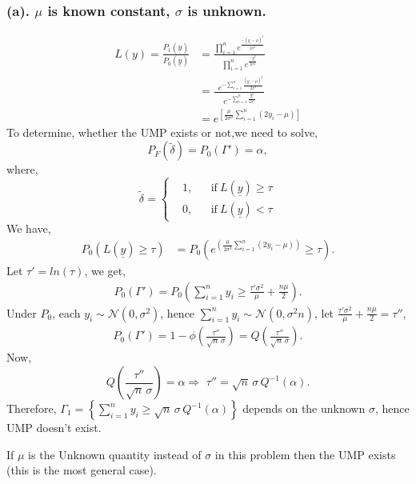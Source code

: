 \documentclass[a4paper,english,12pt]{article}
\begin{document}
\subsubsection*{(a). $\mu$ is known constant, $\sigma$ is unknown.}
\begin{align*}
L(y)=\frac{P_1(\underline{y})}{P_0(\underline{y})}&=\frac{\prod\limits_{i=1}^{n} e^{\frac{-(y_i - \mu)^2}{2 \sigma^2}}}{ \prod\limits_{i=1}^{n} e^{\frac{-y_i^2}{2 \sigma^2}}}\\
&=\frac{\,\,\, e^{-\sum\limits_{i=1}^n \frac{(y_i - \mu)^2}{2 \sigma^2}}}{\, e^{-\sum\limits_{i=1}^n\frac{y_i^2}{2 \sigma^2}}}\\
&=e^{\left[\frac{\mu}{2 \sigma^2}\sum\limits_{i=1}^n(2y_i-\mu)\right]}
\end{align*}
To determine, whether the UMP exists or not,we need to solve,
\begin{equation}
P_F(\tilde{\delta})=P_0(\Gamma')=\alpha,
\end{equation}
where,
 \begin{equation}
\tilde{\delta}= \left \{
  \begin{aligned}
    &1, && \text{if}\ L(\underline{y})\geq\tau \\
    &0, && \text{if}\ L(\underline{y})<\tau 
  \end{aligned} \right.
\end{equation}
We have,
\begin{align*}
P_0(L(\underline{y})\geq\tau)&=P_0 (e^{\left( \frac{\mu}{2 \sigma^2}\sum\limits_{i=1}^n(2y_i-\mu)\right)} \geq \tau).
\end{align*}
Let $\tau' =ln(\tau)$, we get,
\begin{align*}
P_0(\Gamma')=P_0 \left(\sum\limits_{i=1}^n y_i\geq\frac{\tau' \sigma^2}{\mu}+\frac{n\mu}{2}\right).
\end{align*}
Under $P_0$, each $y_i \sim \mathcal{N}(0,\sigma^2)$, hence $\sum\limits_{i=1}^ny_i \sim \mathcal{N}(0,\sigma^2 n)$, let $\frac{\tau \prime \sigma^2}{\mu}+\frac{n\mu}{2}=\tau''$,
\begin{align*}
P_0(\Gamma')=1-\phi\left(\frac{\tau''}{\sqrt{n}\, \sigma}\right)=Q\left(\frac{\tau''}{\sqrt{n}\, \sigma}\right).
\end{align*}
Now,
\begin{equation*}
Q\left(\frac{\tau''}{\sqrt{n}\, \sigma}\right)=\alpha\Rightarrow \,\, \tau''=\sqrt{n}\,\sigma \, Q^{-1}(\alpha).
\end{equation*}
Therefore, $\Gamma_1=\left \{ \sum\limits_{i=1}^n y_i\geq \sqrt{n}\,\sigma \, Q^{-1}(\alpha) \right \}$ depends on the unknown $\sigma$, hence UMP doesn't exist.
\begin{note}
If $\mu$ is the Unknown quantity instead of $\sigma$ in this problem then the UMP exists (this is the most general case).
\end{note}
\end{document}
